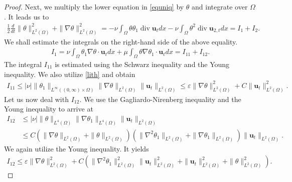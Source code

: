 \documentclass[11pt]{article}
\numberwithin{equation}{section}
\theoremstyle{plain}
\newcommand\bb[1]{\mathbf{#1}}
\newcommand{\tn}{\Omega}
\newcommand{\io}{\int_{\Omega}}
\newcommand{\ld}{L^2(\Omega)}
\newcommand{\ul}{\frac{1}{2}}
\newcommand{\ddt}{\frac{d}{dt}}
\renewcommand{\div}{\operatorname{div}}
\let \epsilon\varepsilon
\begin{document}
\begin{proof}
Next, we multiply the lower equation in \eqref{equniq} by $\theta$ and integrate over $\tn$. It leads us to
\begin{align}\label{eqthuniq}
\ul\ddt \|\theta\|^2_{\ld}+\|\nabla\theta\|_{\ld}^2=- \nu\io\theta\theta_1 \div{\bb u}_{t}dx-\nu\io\theta^2\div\bb u_{2,t}dx=I_1+I_2.
\end{align}
We shall estimate the integrals on the right-hand side of the above equality.
\begin{align}\label{inmthuniq}
I_1 =\nu \io\theta_1\nabla\theta\cdot\bb u_tdx+\mu\io\theta\nabla\theta_1\cdot\bb u_tdx=I_{11}+I_{12}.
\end{align}
The integral $I_{11}$ is estimated using the Schwarz inequality and the Young inequality. We also utilize \eqref{lith} and obtain
\begin{align}\label{in2thuniq}
I_{11}\leq |\nu|\|\theta_1\|_{L^{\infty}((0,\infty)\times\tn)}\|\nabla\theta\|_{\ld}\|\bb u_t\|_{\ld}\leq \epsilon\|\nabla\theta\|_{\ld}^2+C\|\bb u_t\|_{\ld}^2.
\end{align}
Let us now deal with $I_{12}$. We use the Gagliardo-Nirenberg inequality and the Young inequality to arrive at
\begin{align*}
I_{12}&\leq |\nu| \|\theta\|_{L^4(\tn)}\|\nabla\theta_1\|_{L^4(\tn)}\|\bb u_t\|_{\ld}\\
&\leq C(\|\nabla\theta\|_{\ld}+\|\theta\|_{\ld})(\|\nabla^2\theta_1\|_{\ld}+\|\nabla\theta_1\|_{\ld})\|\bb u_t\|_{\ld}.
\end{align*}
We again utilize the Young inequality. It yields
\begin{align}\label{in1thuniq}
I_{12}\leq \epsilon\|\nabla\theta\|_{\ld}^2+ C(\|\nabla^2\theta_1\|_{\ld}^2\|\bb u_t\|_{\ld}^2+\|\bb u_t\|_{\ld}^2+\|\theta\|_{\ld}^2).
\end{align}


\end{proof}
\end{document}
